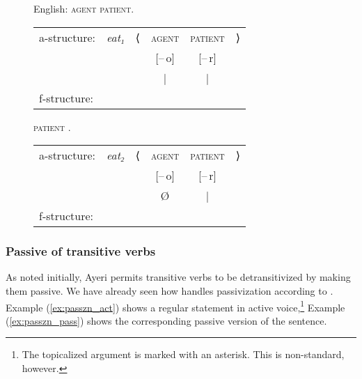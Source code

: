 \begin{figure}
\pex\label{ex:engpassive}%
English:
\a \textsc{agent}  \textsc{patient}.\medskip

\begin{tabular}[t]{@{} l >{\itshape}l l c c r}
a-structure:
	& eat₁
	& ⟨
	& \textsc{agent}
	& \textsc{patient}
	& ⟩
	\\
%
	& %
	& %
	& [–\,o]
	& [–\,r]
	& %
	\\

%
	& %
	& %
	& |
	& |
	& %
	\\

f-structure:
	& %
	& %
	& \Subj
	& \Obj
	& %
	\\
\end{tabular}

\a \textsc{patient} .\medskip

\begin{tabular}[t]{@{} l >{\itshape}l l c c r}
a-structure:
	& eat₂
	& ⟨
	& \textsc{agent}
	& \textsc{patient}
	& ⟩
	\\
%
	& %
	& %
	& [–\,o]
	& [–\,r]
	& %
	\\

%
	& %
	& %
	& Ø
	& |
	& %
	\\

f-structure:
	& %
	& %
	& %
	& \Subj
	& %
	\\
\end{tabular}
\xe
\end{figure}

\subsubsection{Passive of transitive verbs}

As noted initially, Ayeri permits transitive verbs to be detransitivized by
making them passive. We have already seen how \Lfg{} handles passivization
according to \citet{bresnan2016}. Example (\ref{ex:passzn_act}) shows a regular
statement in active voice,\footnote{The topicalized argument is marked with an
asterisk. This is non-standard, however.} Example (\ref{ex:passzn_pass}) shows the
corresponding passive version of the sentence.

